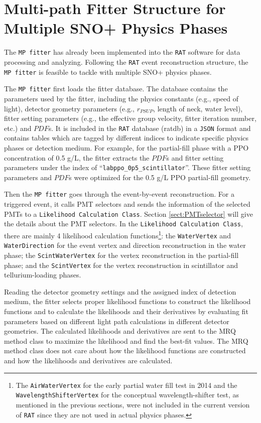 \section{Multi-path Fitter Structure for Multiple SNO+ Physics Phases}

The \texttt{MP fitter} has already been implemented into the \texttt{RAT} software for data processing and analyzing. Following the \texttt{RAT} event reconstruction structure, the \texttt{MP fitter} is feasible to tackle with multiple SNO+ physics phases. 

The \texttt{MP fitter} first loads the fitter database. The database contains the parameters used by the fitter, including the physics constants (e.g., speed of light), detector geometry parameters (e.g., $r_{PSUP}$, length of neck, water level), fitter setting parameters (e.g., the effective group velocity, fitter iteration number, etc.) and $PDF$s. It is included in the \texttt{RAT} database (ratdb) in a \texttt{JSON} format\cite{JSONwiki} and contains tables which are tagged by different indices to indicate specific physics phases or detection medium. For example, for the partial-fill phase with a PPO concentration of 0.5 g/L, the fitter extracts the $PDF$s and fitter setting parameters under the index of ``\texttt{labppo\_0p5\_scintillator}''. These fitter setting parameters and $PDF$s were optimized for the 0.5 g/L PPO partial-fill geometry.

Then the \texttt{MP fitter} goes through the event-by-event reconstruction. For a triggered event, it calls PMT selectors and sends the information of the selected PMTs to a \texttt{Likelihood Calculation Class}. Section \ref{sect:PMTselector} will give the details about the PMT selectors. In the \texttt{Likelihood Calculation Class}, there are mainly 4 likelihood calculation functions\footnote{The \texttt{AirWaterVertex} for the early partial water fill test in 2014 and the \texttt{WavelengthShifterVertex} for the conceptual wavelength-shifter test, as mentioned in the previous sections, were not included in the current version of \texttt{RAT} since they are not used in actual physics phases.}: the \texttt{WaterVertex} and \texttt{WaterDirection} for the event vertex and direction reconstruction in the water phase; the \texttt{ScintWaterVertex} for the vertex reconstruction in the partial-fill phase; and the \texttt{ScintVertex} for the vertex reconstruction in scintillator and tellurium-loading phases.

Reading the detector geometry settings and the assigned index of detection medium, the fitter selects proper likelihood functions to construct the likelihood functions and to calculate the likelihoods and their derivatives by evaluating fit parameters based on different light path calculations in different detector geometries. The calculated likelihoods and derivatives are sent to the MRQ method class to maximize the likelihood and find the best-fit values. The MRQ method class does not care about how the likelihood functions are constructed and how the likelihoods and derivatives are calculated. 
	
